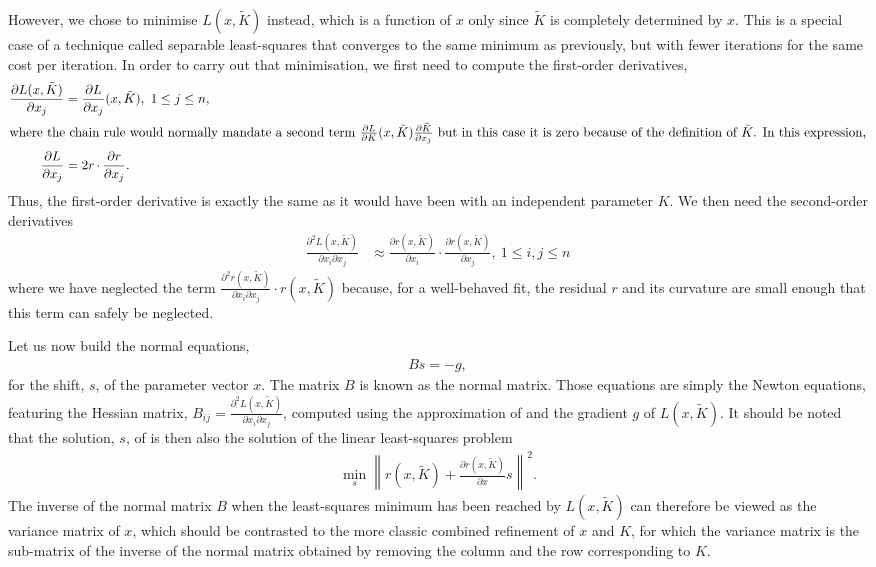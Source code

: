 \documentclass[pdf]{iucr}
\newcommand{\norm}[1]{\left\| #1 \right\|}
\DeclareMathOperator{\dotprod}{\cdot}
\newcommand{\partialder}[2]{\frac{\partial #1}{\partial #2}}
\newcommand{\partialderxy}[3]{\frac{\partial^2 #1}{\partial #2 \partial #3}}
\begin{document}
However, we chose to minimise $L(x, \tilde{K})$ instead, which is a function of $x$ only since $\tilde{K}$ is completely determined by $x$. This is a special case of a technique called separable least-squares  that  converges to the same minimum as previously, but with fewer iterations for the same cost per iteration. In order to carry out that minimisation, we first need to compute the first-order derivatives,
\begin{align}
\partialder{L(x, \tilde{K})}{x_j} &= \partialder{L}{x_j}(x, \tilde{K}),\ 1 \le j \le n, \\
\shortintertext{where the chain rule would normally mandate a second term $\partialder{L}{K}(x, \tilde{K})\partialder{\tilde{K}}{x_j}$ but in this case it is zero because of the definition of $\tilde{K}$. In this expression,}
\partialder{L}{x_j} &= 2 r \dotprod \partialder{r}{x_j}.
\end{align}
Thus, the first-order derivative is exactly the same as it would have been with an independent parameter $K$. We then need the second-order derivatives
\begin{align}
\partialderxy{L(x, \tilde{K})}{x_i}{x_j} &\approx \partialder{r(x, \tilde{K})}{x_i} \dotprod \partialder{r(x, \tilde{K})}{x_j},\ 1 \le i,j \le n
\label{eqn:gaussleastsquares}
\end{align}
where we have neglected the term $\partialderxy{r(x, \tilde{K})}{x_i}{x_j} \dotprod r(x, \tilde{K})$ because, for a well-behaved fit, the residual $r$ and its curvature are small enough that this term can safely be neglected.

Let us now build the normal equations, 
\begin{align}
\label{eqn:gaussnewtoneq}
Bs = -g,
\end{align}
for the shift, $s$, of the parameter vector $x$. The matrix $B$ is known as the normal matrix. Those equations are simply the Newton equations, featuring the Hessian matrix, $B_{ij} = \partialderxy{L(x, \tilde{K})}{x_i}{x_j}$, computed using the approximation of  and the gradient $g$ of $L(x, \tilde{K})$. It should be noted that the solution, $s$, of  is then also the solution of the linear least-squares problem
\begin{align}
\label{eqn:gaussnewtonaslinearls}
\min_s \norm{r(x, \tilde{K}) + \partialder{r(x, \tilde{K})}{x} s}^2.
\end{align}
The inverse of the normal matrix $B$ when the least-squares minimum has been reached by $L(x, \tilde{K})$ can therefore be viewed as the variance matrix of $x$, which should be contrasted to the more classic combined refinement of $x$ and $K$, for which the variance matrix is the sub-matrix of the inverse of the normal matrix obtained by removing the column and the row corresponding to $K$. 
\end{document}
